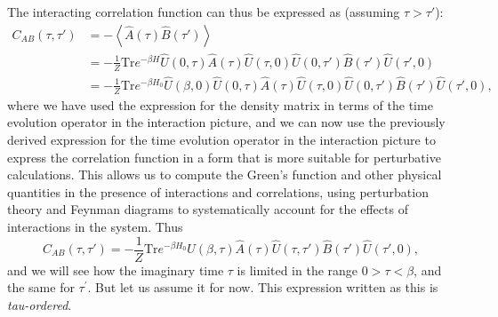 The interacting correlation function can thus be expressed as (assuming \(\tau > \tau'\)):
\[
    \begin{aligned}
        C_{AB}(\tau, \tau') & = - \left\langle \hat{A}(\tau) \hat{B}(\tau') \right\rangle                                                                                                 \\
                            & =  -\frac{1}{Z} \mathrm{Tr} e^{-\beta H} \hat{U}(0,\tau) \hat{A}(\tau) \hat{U}(\tau,0) \hat{U}(0,\tau') \hat{B}(\tau') \hat{U}(\tau',0)                     \\
                            & = -\frac{1}{Z} \mathrm{Tr} e^{-\beta H_0} \hat{U}(\beta, 0) \hat{U}(0,\tau) \hat{A}(\tau) \hat{U}(\tau,0) \hat{U}(0,\tau') \hat{B}(\tau') \hat{U}(\tau',0),
    \end{aligned}
\]
where we have used the expression for the density matrix in terms of the time evolution operator in the interaction picture, and we can now use the previously derived expression for the time evolution operator in the interaction picture to express the correlation function in a form that is more suitable for perturbative calculations. This allows us to compute the Green's function and other physical quantities in the presence of interactions and correlations, using perturbation theory and Feynman diagrams to systematically account for the effects of interactions in the system. Thus
\[
    C_{AB}(\tau, \tau') = -\frac{1}{Z} \mathrm{Tr} e^{-\beta H_0} \hat{U}(\beta, \tau) \hat{A}(\tau) \hat{U}(\tau, \tau') \hat{B}(\tau') \hat{U}(\tau', 0),
\]
and we will see how the imaginary time \(\tau\) is limited in the range \(0> \tau < \beta\), and the same for \(\tau^{\prime}\). But let us assume it for now. This expression written as this is \textit{tau-ordered}.

